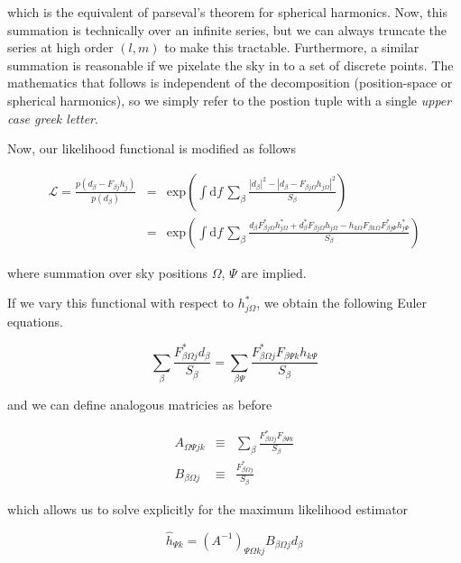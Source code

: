 \documentclass[10pt]{article}
\begin{document}
which is the equivalent of parseval's theorem for spherical harmonics. Now, this summation is technically over an infinite series, but we can always truncate the series at high order $(l,m)$ to make this tractable. Furthermore, a similar summation is reasonable if we pixelate the sky in
to a set of discrete points. The mathematics that follows is independent of the decomposition (position-space or spherical harmonics), so we simply refer to the postion tuple with a single \emph{upper case greek letter}.


Now, our likelihood functional is modified as follows

\begin{eqnarray}
\mathcal{L} = \frac{p(d_\beta - F_{\beta j}h_j)}{p(d_\beta)} & = & \mathrm{exp}\left(\int\mathrm{d}f\, \sum_\beta \frac{\left|d_\beta\right|^2 - \left|d_\beta - F_{\beta j \Omega}h_{j \Omega}\right|^2}{S_\beta} \right) \\
                                              & = & \mathrm{exp}\left(\int\mathrm{d}f\, \sum_\beta \frac{d_\beta F_{\beta j \Omega}^\ast h_{j \Omega}^\ast + d_\beta^\ast F_{\beta j \Omega}h_{j \Omega} - h_{k \Omega} F_{\beta k \Omega} F_{\beta j \Psi}^\ast h_{j \Psi}^\ast}{S_\beta} \right)
\end{eqnarray}

where summation over sky positions $\Omega$, $\Psi$ are implied.

If we vary this functional with respect to $h^\ast_{j\Omega}$, we obtain the following Euler equations.

\begin{equation}
\sum\limits_\beta \frac{F_{\beta \Omega j}^\ast d_\beta}{S_\beta} = \sum\limits_{\beta\Psi} \frac{F_{\beta\Omega j}^\ast F_{\beta \Psi k} h_{k \Psi}}{S_\beta}
\end{equation}

and we can define analogous matricies as before

\begin{eqnarray}
A_{\Omega\Psi j k} & \equiv & \sum\limits_\beta \frac{F_{\beta\Omega j}^\ast F_{\beta \Psi k}}{S_\beta} \\
B_{\beta\Omega j} & \equiv & \frac{F_{\beta\Omega j}^\ast}{S_\beta}
\end{eqnarray}

which allows us to solve explicitly for the maximum likelihood estimator

\begin{equation}
\hat{h}_{\Psi k} = \left(A^{-1}\right)_{\Psi\Omega k j} B_{\beta \Omega j} d_\beta
\end{equation}
\end{document}

